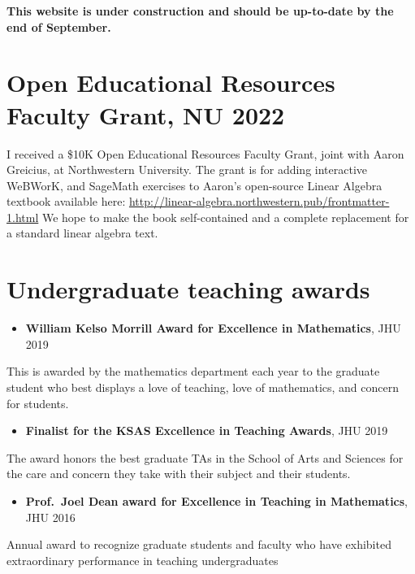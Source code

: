 \documentclass[
]{report}
\providecommand{\tightlist}{%
  \setlength{\itemsep}{0pt}\setlength{\parskip}{0pt}}
\begin{document}
\textbf{This website is under construction and should be up-to-date by the end of September.}

\hypertarget{open-educational-resources-faculty-grant-nu-2022}{%
\section{Open Educational Resources Faculty Grant, NU 2022}\label{open-educational-resources-faculty-grant-nu-2022}}

I received a \$10K Open Educational Resources Faculty Grant, joint with Aaron Greicius, at Northwestern University.
The grant is for adding interactive WeBWorK, and SageMath exercises to Aaron's open-source Linear Algebra textbook available here: \url{http://linear-algebra.northwestern.pub/frontmatter-1.html}
We hope to make the book self-contained and a complete replacement for a standard linear algebra text.

\hypertarget{undergraduate-teaching-awards}{%
\section{Undergraduate teaching awards}\label{undergraduate-teaching-awards}}

\begin{itemize}
\tightlist
\item
  \textbf{William Kelso Morrill Award for Excellence in Mathematics}, JHU 2019
\end{itemize}

This is awarded by the mathematics department each year to the graduate student who best displays a love of teaching, love of mathematics, and concern for students.

\begin{itemize}
\tightlist
\item
  \textbf{Finalist for the KSAS Excellence in Teaching Awards}, JHU 2019
\end{itemize}

The award honors the best graduate TAs in the School of Arts and Sciences for the care and concern they take with their subject and their students.

\begin{itemize}
\tightlist
\item
  \textbf{Prof.~Joel Dean award for Excellence in Teaching in Mathematics}, JHU 2016
\end{itemize}

Annual award to recognize graduate students and faculty who have exhibited extraordinary performance in teaching undergraduates
\end{document}
